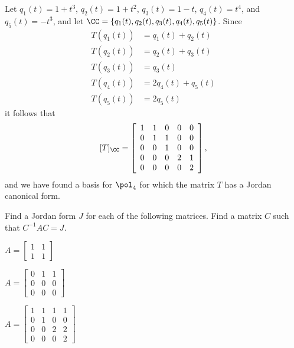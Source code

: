 \begin{example}
Let $q_1(t) = 1+t^3$, $q_2(t) = 1+t^2$, $q_3(t) = 1-t$, $q_4(t) = t^4$, and $q_5(t) = -t^3$, and let $\CC = \{q_1(t), q_2(t), q_3(t), q_4(t), q_5(t)\}$. Since  
\begin{align*}
T(q_1(t)) &= q_1(t)+q_2(t) \\
T(q_2(t)) &= q_2(t)+q_3(t) \\
T(q_3(t)) &= q_3(t) \\
T(q_4(t)) &= 2q_4(t)+q_5(t) \\
T(q_5(t)) &= 2q_5(t) 
\end{align*}
it follows that 
\[[T]_{\CC} = \left[ \begin{array}{ccccc} 1&1&0&0&0 \\ 0&1&1&0&0 \\ 0&0&1&0&0 \\ 0&0&0&2&1 \\ 0&0&0&0&2 \end{array} \right],\]
and we have found a basis for $\pol_4$ for which the matrix $T$ has a Jordan canonical form. 
\end{example}



\ExampleIntro

\begin{example} Find a Jordan form $J$ for each of the following matrices. Find a matrix $C$ such that $C^{-1}AC = J$. 
\ba
\begin{minipage}{2in} \item $A = \left[ \begin{array}{cc} 1&1\\1&1 \end{array} \right]$ \end{minipage} \begin{minipage}{2in}\item $A = \left[ \begin{array}{ccc} 0&1&1\\0&0&0 \\ 0&0&0 \end{array} \right]$ \end{minipage} \begin{minipage}{2in} \item $A = \left[ \begin{array}{cccc} 1&1&1&1\\0&1&0&0\\0&0&2&2 \\ 0&0&0&2 \end{array} \right]$ \end{minipage}
\ea

\ExampleSolution

\end{example}

